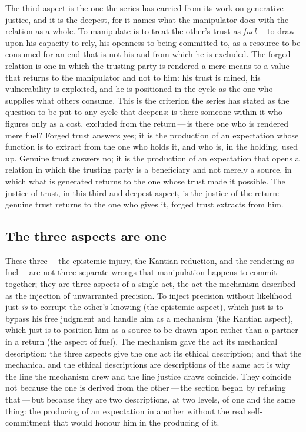 The third aspect is the one the series has carried from its work on generative justice, and it is the deepest, for it names what the manipulator does with the relation as a whole. To manipulate is to treat the other's trust as \emph{fuel}\,---\,to draw upon his capacity to rely, his openness to being committed-to, as a resource to be consumed for an end that is not his and from which he is excluded. The forged relation is one in which the trusting party is rendered a mere means to a value that returns to the manipulator and not to him: his trust is mined, his vulnerability is exploited, and he is positioned in the cycle as the one who supplies what others consume. This is the criterion the series has stated as the question to be put to any cycle that deepens: is there someone within it who figures only as a cost, excluded from the return\,---\,is there one who is rendered mere fuel? Forged trust answers yes; it is the production of an expectation whose function is to extract from the one who holds it, and who is, in the holding, used up. Genuine trust answers no; it is the production of an expectation that opens a relation in which the trusting party is a beneficiary and not merely a source, in which what is generated returns to the one whose trust made it possible. The justice of trust, in this third and deepest aspect, is the justice of the return: genuine trust returns to the one who gives it, forged trust extracts from him.

\subsection{The three aspects are one}
\label{p13:sub:just-oneact}

These three\,---\,the epistemic injury, the Kantian reduction, and the rendering-as-fuel\,---\,are not three separate wrongs that manipulation happens to commit together; they are three aspects of a single act, the act the mechanism described as the injection of unwarranted precision. To inject precision without likelihood just \emph{is} to corrupt the other's knowing (the epistemic aspect), which just is to bypass his free judgment and handle him as a mechanism (the Kantian aspect), which just is to position him as a source to be drawn upon rather than a partner in a return (the aspect of fuel). The mechanism gave the act its mechanical description; the three aspects give the one act its ethical description; and that the mechanical and the ethical descriptions are descriptions of the same act is why the line the mechanism drew and the line justice draws coincide. They coincide not because the one is derived from the other\,---\,the section began by refusing that\,---\,but because they are two descriptions, at two levels, of one and the same thing: the producing of an expectation in another without the real self-commitment that would honour him in the producing of it.


